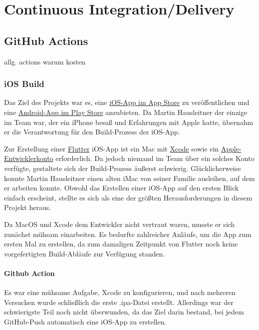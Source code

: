 \section{Continuous Integration/Delivery}
\subsection{GitHub Actions}

allg. actions warum kosten
\subsubsection{iOS Build}
Das Ziel des Projekts war es, eine \href{https://www.apple.com/ios/app-store/}{iOS-App im App Store} zu veröffentlichen und eine \href{https://play.google.com/store/apps}{Android-App im Play Store} anzubieten. Da Martin Hausleitner der einzige im Team war, der ein iPhone besaß und Erfahrungen mit Apple hatte, übernahm er die Verantwortung für den Build-Prozess der iOS-App.

Zur Erstellung einer \href{https://flutter.dev/}{Flutter}
iOS-App ist ein Mac mit
\href{https://developer.apple.com/xcode/}{Xcode} sowie ein
\href{https://developer.apple.com/programs/}{Apple-Entwicklerkonto}
erforderlich. Da jedoch niemand im Team über ein solches
Konto verfügte, gestaltete sich der Build-Prozess äußerst
schwierig. Glücklicherweise konnte Martin Hausleitner einen
alten iMac von seiner Familie ausleihen, auf dem er arbeiten
konnte. Obwohl das Erstellen einer iOS-App auf den ersten
Blick einfach erscheint, stellte es sich als eine der
größten Herausforderungen in diesem Projekt heraus.

Da MacOS und Xcode dem Entwickler nicht vertraut waren, musste er sich zunächst mühsam einarbeiten. Es bedurfte zahlreicher Anläufe, um die App zum ersten Mal zu erstellen, da zum damaligen Zeitpunkt von Flutter noch keine vorgefertigten Build-Abläufe zur Verfügung standen.





\paragraph{Github Action}
Es war eine mühsame Aufgabe, Xcode zu konfigurieren, und
nach mehreren Versuchen wurde schließlich die erste
.ipa-Datei erstellt. Allerdings war der schwierigste Teil
noch nicht überwunden, da das Ziel darin bestand, bei jedem
GitHub-Push automatisch eine iOS-App zu erstellen.

